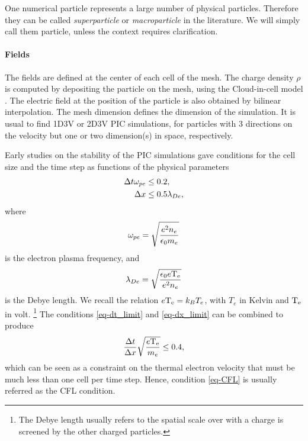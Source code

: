     One numerical particle represents a large number of physical particles. 
    Therefore they can be called \emph{superparticle} or \emph{macroparticle} in the literature.
    We will simply call them particle, unless the context requires clarification.
    
    \paragraph{Fields\\}
    The fields are defined at the center of each cell of the mesh.
    The charge density $\rho$ is computed by depositing the particle on the mesh, using the Cloud-in-cell model \cite{birdsall1991}.
    The electric field at the position of the particle is also obtained by bilinear interpolation.
    The mesh dimension defines the dimension of the simulation.
    It is usual to find \acs{1D}\acs{3V} or \acs{2D}\acs{3V} \ac{PIC} simulations, for particles with 3 directions on the velocity but one or two dimension(s) in space, respectively.
    
    Early studies on the stability of the \ac{PIC} simulations gave conditions for the cell size and the time step as functions of the physical parameters \citep{birdsall1991,turner2013}
    \begin{align}
      \Delta t  \omega_{pe} &\leq 0.2,  \label{eq-dt_limit} \\
      \Delta x &\leq 0.5 \lambda_{De}, \label{eq-dx_limit}
    \end{align}
    where 
    \begin{equation} \label{eq-def_ope}
      \omega_{pe} =  \sqrt{\frac{e^2 n_e}{ \epsilon_0 m_e}}
    \end{equation}
    is the electron plasma frequency, and 
    \begin{equation} \label{eq-def_lde}
        \lambda_{De} = \sqrt{\frac{ \epsilon_0 e\mathrm{T_e}}{e^2 n_e}} 
    \end{equation}
    is the Debye length.
    We recall the relation $e \mathrm{T_e} = k_B T_e$, with $T_e$ in Kelvin and $\mathrm{T_e}$ in volt.
    \footnote{The Debye length usually refers to the spatial scale over with a charge is screened by the other charged particles. }
    The conditions \ref{eq-dt_limit} and \ref{eq-dx_limit} can be combined to produce 
    \begin{equation} \label{eq-CFL}
      \frac{\Delta t}{\Delta x}\sqrt{\frac{e \mathrm{T_e}}{m_e}} \leq 0.4,
    \end{equation}
    which can be seen as a constraint on the thermal electron velocity that must be much less than one cell per time step.
    Hence, condition \ref{eq-CFL} is usually referred as the CFL condition.
    
